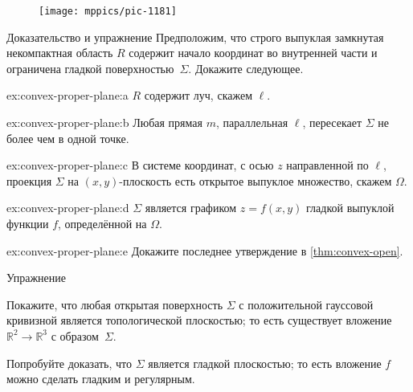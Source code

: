 {

\begin{figure}
\vskip-0mm
\centering
\texttt{[image: mppics/pic-1181]}
\vskip2mm
\end{figure}

\begin{thm}{Доказательство и упражнение}\label{ex:convex-proper-plane}
Предположим, что строго выпуклая замкнутая некомпактная область $R$ содержит начало координат во внутренней части и ограничена гладкой поверхностью~$\Sigma$.
Докажите следующее.

\begin{subthm}{ex:convex-proper-plane:a}
$R$ содержит луч, скажем $\ell$.
\end{subthm}

\begin{subthm}{ex:convex-proper-plane:b}
Любая прямая $m$, параллельная $\ell$, пересекает $\Sigma$ не более чем в одной точке.
\end{subthm}

\begin{subthm}{ex:convex-proper-plane:c}
В системе координат, с осью $z$ направленной по $\ell$, проекция $\Sigma$ на $(x,y)$-плоскость есть открытое выпуклое множество, скажем $\Omega$.
\end{subthm}

\begin{subthm}{ex:convex-proper-plane:d}
$\Sigma$ является графиком $z=f(x,y)$ гладкой выпуклой функции $f$, определённой на $\Omega$.
\end{subthm}

\begin{subthm}{ex:convex-proper-plane:e}
Докажите последнее утверждение в \ref{thm:convex-open}.
\end{subthm}

\end{thm}

}


\begin{thm}{Упражнение}\label{ex:open+convex=plane}
{\sloppy
Покажите, что любая открытая поверхность $\Sigma$ с положительной гауссовой кривизной является топологической плоскостью;
то есть существует вложение $\mathbb{R}^2\to\mathbb{R}^3$ с образом~$\Sigma$.

}

Попробуйте доказать, что $\Sigma$ является гладкой плоскостью;
то есть вложение $f$ можно сделать гладким и регулярным.
\end{thm}

